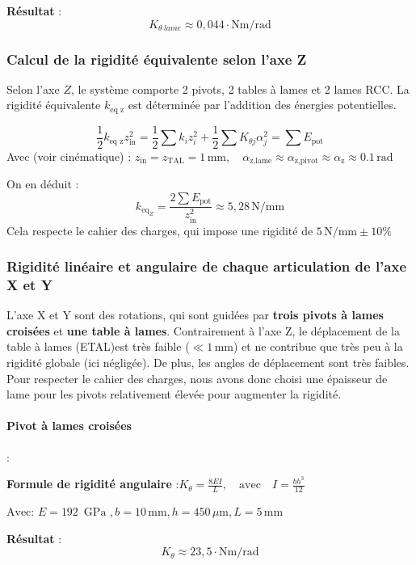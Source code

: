 \documentclass[a4paper, 11pt]{article} %
\begin{document}
\textbf{Résultat} :
$$
K_{\theta\ lame} \approx 0,044\cdot\text{N}\text{m}/\text{rad}
$$
\subsubsection*{Calcul de la rigidité équivalente selon l'axe Z}
Selon l’axe $Z$, le système comporte 2 pivots, 2 tables à lames et 2 lames RCC. La rigidité équivalente $k_{\text{eq z}}$ est déterminée par l’addition des énergies potentielles.


$$
\frac{1}{2} k_{\text{eq z}} z_{\text{in}}^2 = \frac{1}{2} \sum k_i z_i^2 + \frac{1}{2} \sum K_{\theta j} \alpha_j^2 = \sum E_{\text{pot}}
$$
Avec (voir cinématique) :
$ z_{\text{in}} = z_{\text{TAL}} =1\, \text{mm},\quad \alpha_{\text{z,lame}} \approx \alpha_{\text{z,pivot}}\approx \alpha_{\text{z}} \approx 0.1\, \text{rad }$


On en déduit :
$$
k_{\text{eq}_Z} = \frac{2 \sum E_{\text{pot}}}{z_{\text{in}}^2} \approx 5,28
 \, \text{N/mm}
$$
 Cela respecte le cahier des charges, qui impose une rigidité de \(5\,\text{N/mm} \pm 10\%\)

\subsubsection*{Rigidité linéaire et angulaire de chaque articulation de l'axe X et Y}
L'axe X et Y sont des rotations, qui sont guidées par \textbf{trois pivots à lames croisées} et \textbf{une table à lames}. Contrairement à l'axe Z, le déplacement de la table à lames (ETAL)est très faible ($\ll 1\,\text{mm}$) et ne contribue que très peu à la rigidité globale (ici négligée). De plus, les angles de déplacement sont très faibles. Pour respecter le cahier des charges, nous avons donc choisi une épaisseur de lame pour les pivots relativement élevée pour augmenter la rigidité.


\paragraph{Pivot à lames croisées}:

\textbf{Formule de rigidité angulaire} :\(K_\theta = \frac{8EI}{L}, \quad \text{avec} \quad I = \frac{b h^3}{12}\)


$ \text{Avec: } E = 192 \, \text{ GPa } , b = 10 \, \text{mm}, h = 450 \, \mu\text{m}, L = 5 \, \text{mm} $


\textbf{Résultat} : $$K_\theta \approx 23,5
 \cdot\text{N}\text{m}/\text{rad}$$
\end{document}
